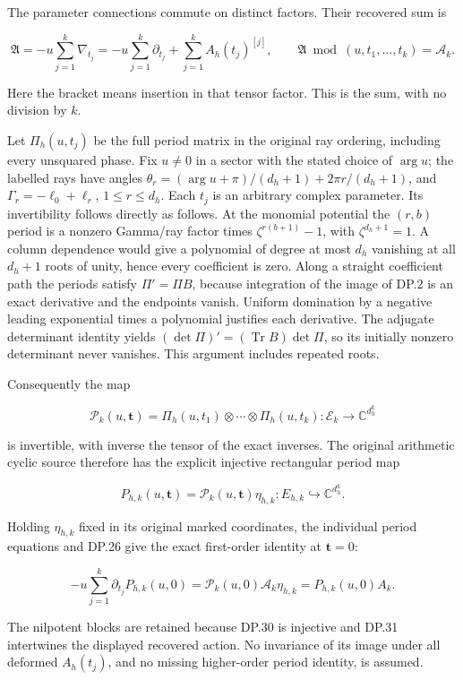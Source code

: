 \documentclass{article}
\begin{document}
The parameter connections commute on distinct factors. Their recovered sum is

\[
\mathfrak A=-u\sum_{j=1}^k\nabla_{t_j}
=-u\sum_{j=1}^k\partial_{t_j}
 +\sum_{j=1}^k A_h(t_j)^{[j]},
\qquad
\mathfrak A\bmod(u,t_1,\ldots,t_k)=\mathcal A_k.
\tag{DP.28}
\]

Here the bracket means insertion in that tensor factor. This is the sum, with no division by \(k\).

Let \(\Pi_h(u,t_j)\) be the full period matrix in the original ray ordering, including every unsquared phase. Fix \(u\ne0\) in a sector with the stated choice of \(\arg u\); the labelled rays have angles \(\theta_r=(\arg u+\pi)/(d_h+1)+2\pi r/(d_h+1)\), and \(\Gamma_r=-\ell_0+\ell_r\), \(1\le r\le d_h\). Each \(t_j\) is an arbitrary complex parameter. Its invertibility follows directly as follows. At the monomial potential the \((r,b)\) period is a nonzero Gamma/ray factor times \(\zeta^{r(b+1)}-1\), with \(\zeta^{d_h+1}=1\). A column dependence would give a polynomial of degree at most \(d_h\) vanishing at all \(d_h+1\) roots of unity, hence every coefficient is zero. Along a straight coefficient path the periods satisfy \(\Pi'=\Pi B\), because integration of the image of DP.2 is an exact derivative and the endpoints vanish. Uniform domination by a negative leading exponential times a polynomial justifies each derivative. The adjugate determinant identity yields \((\det\Pi)'=(\operatorname{Tr}B)\det\Pi\), so its initially nonzero determinant never vanishes. This argument includes repeated roots.

Consequently the map

\[
\mathscr P_k(u,\mathbf t)
=\Pi_h(u,t_1)\otimes\cdots\otimes\Pi_h(u,t_k)
:\mathcal E_k\longrightarrow\mathbb C^{d_h^k}
\tag{DP.29}
\]

is invertible, with inverse the tensor of the exact inverses. The original arithmetic cyclic source therefore has the explicit injective rectangular period map

\[
P_{h,k}(u,\mathbf t)=\mathscr P_k(u,\mathbf t)\eta_{h,k}
:E_{h,k}\hookrightarrow\mathbb C^{d_h^k}.
\tag{DP.30}
\]

Holding \(\eta_{h,k}\) fixed in its original marked coordinates, the individual period equations and DP.26 give the exact first-order identity at \(\mathbf t=0\):

\[
-u\sum_{j=1}^k\partial_{t_j}P_{h,k}(u,0)
=\mathscr P_k(u,0)\mathcal A_k\eta_{h,k}
=P_{h,k}(u,0)A_k.
\tag{DP.31}
\]

The nilpotent blocks are retained because DP.30 is injective and DP.31 intertwines the displayed recovered action. No invariance of its image under all deformed \(A_h(t_j)\), and no missing higher-order period identity, is assumed.
\end{document}
